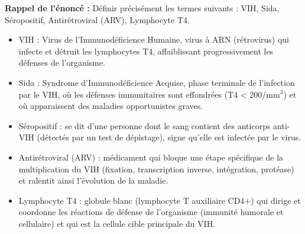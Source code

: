 \documentclass[11pt]{article}
\newcommand{\cle}[1]{{\popxbold\color{popdark}#1}}
\begin{document}
\begin{corrige}
\textbf{Rappel de l'énoncé :} Définir précisément les termes suivants : VIH, Sida, Séropositif, Antirétroviral (ARV), Lymphocyte T4.
\tcblower
\begin{itemize}
\item \cle{VIH} : Virus de l'Immunodéficience Humaine, virus à ARN (rétrovirus) qui infecte et détruit les lymphocytes T4, affaiblissant progressivement les défenses de l'organisme.
\item \cle{Sida} : Syndrome d'Immunodéficience Acquise, phase terminale de l'infection par le VIH, où les défenses immunitaires sont effondrées (T4 < 200/mm$^3$) et où apparaissent des maladies opportunistes graves.
\item \cle{Séropositif} : se dit d'une personne dont le sang contient des anticorps anti-VIH (détectés par un test de dépistage), signe qu'elle est infectée par le virus.
\item \cle{Antirétroviral (ARV)} : médicament qui bloque une étape spécifique de la multiplication du VIH (fixation, transcription inverse, intégration, protéase) et ralentit ainsi l'évolution de la maladie.
\item \cle{Lymphocyte T4} : globule blanc (lymphocyte T auxiliaire CD4+) qui dirige et coordonne les réactions de défense de l'organisme (immunité humorale et cellulaire) et qui est la cellule cible principale du VIH.
\end{itemize}
\end{corrige}
\end{document}
